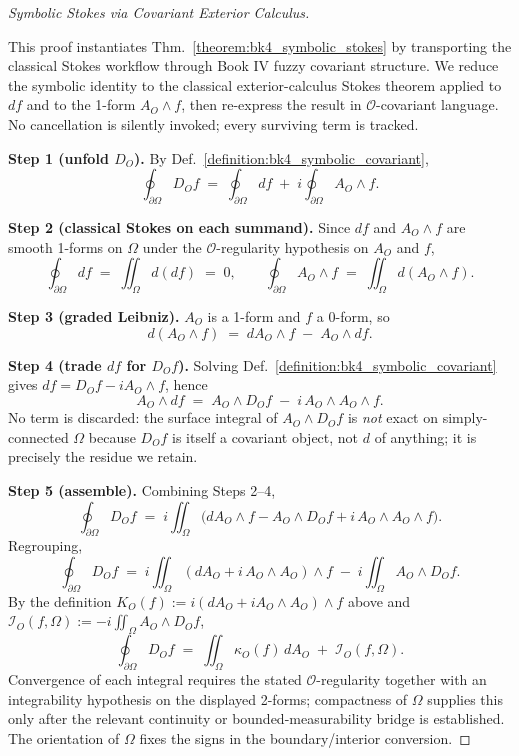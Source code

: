 \begin{proof}[Symbolic Stokes via Covariant Exterior Calculus]
\label{proof:bk4_sketch_stokes}
\leavevmode

This proof instantiates Thm.~\ref{theorem:bk4_symbolic_stokes} by transporting the classical Stokes workflow through Book IV fuzzy covariant structure. We reduce the symbolic identity to the classical exterior-calculus Stokes theorem applied to $df$ and to the 1-form $A_O \wedge f$, then re-express the result in $\mathcal{O}$-covariant language. No cancellation is silently invoked; every surviving term is tracked.

\textbf{Step 1 (unfold $D_O$).} By Def.~\ref{definition:bk4_symbolic_covariant},
\[
\oint_{\partial\Omega} D_O f \;=\; \oint_{\partial\Omega} df \;+\; i \oint_{\partial\Omega} A_O \wedge f.
\]

\textbf{Step 2 (classical Stokes on each summand).} Since $df$ and $A_O \wedge f$ are smooth 1-forms on $\Omega$ under the $\mathcal{O}$-regularity hypothesis on $A_O$ and $f$,
\[
\oint_{\partial\Omega} df \;=\; \iint_\Omega d(df) \;=\; 0, \qquad
\oint_{\partial\Omega} A_O \wedge f \;=\; \iint_\Omega d(A_O \wedge f).
\]

\textbf{Step 3 (graded Leibniz).} $A_O$ is a 1-form and $f$ a 0-form, so
\[
d(A_O \wedge f) \;=\; dA_O \wedge f \;-\; A_O \wedge df.
\]

\textbf{Step 4 (trade $df$ for $D_O f$).} Solving Def.~\ref{definition:bk4_symbolic_covariant} gives $df = D_O f - iA_O \wedge f$, hence
\[
A_O \wedge df \;=\; A_O \wedge D_O f \;-\; i\, A_O \wedge A_O \wedge f.
\]
No term is discarded: the surface integral of $A_O \wedge D_O f$ is \emph{not} exact on simply-connected $\Omega$ because $D_O f$ is itself a covariant object, not $d$ of anything; it is precisely the residue we retain.

\textbf{Step 5 (assemble).} Combining Steps 2--4,
\[
\oint_{\partial\Omega} D_O f \;=\; i \iint_\Omega \bigl( dA_O \wedge f - A_O \wedge D_O f + i\, A_O \wedge A_O \wedge f \bigr).
\]
Regrouping,
\[
\oint_{\partial\Omega} D_O f \;=\; i \iint_\Omega (dA_O + i\, A_O \wedge A_O) \wedge f \;-\; i \iint_\Omega A_O \wedge D_O f.
\]
By the definition $K_O(f) := i(dA_O + iA_O \wedge A_O) \wedge f$ above and $\mathcal{I}_O(f,\Omega) := -i \iint_\Omega A_O \wedge D_O f$,
\[
\oint_{\partial\Omega} D_O f \;=\; \iint_\Omega \kappa_O(f)\, dA_O \;+\; \mathcal{I}_O(f,\Omega).
\]
Convergence of each integral requires the stated $\mathcal{O}$-regularity together with an integrability hypothesis on the displayed 2-forms; compactness of $\Omega$ supplies this only after the relevant continuity or bounded-measurability bridge is established. The orientation of $\Omega$ fixes the signs in the boundary/interior conversion.


\end{proof}
